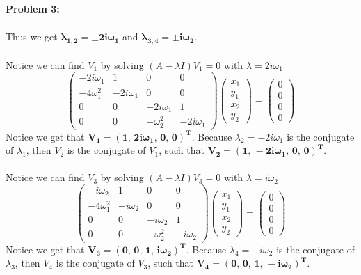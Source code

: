 \documentclass[11pt]{article}
\newenvironment{problem}[1]{\textbf{Problem #1: }}{\newpage}
\begin{document}
\begin{problem}{3}
\begin{enumerate}[label = (\alph*)]
\begin{align*}
			\end{align*}
			Thus we get $\boldsymbol{\lambda_{1,2} = \pm 2i\omega_1}$ and $\boldsymbol{\lambda_{3,4} = \pm i\omega_2}$.  
			\\ \\
			Notice we can find $V_1$ by solving $(A - \lambda I)V_1 = 0$ with $\lambda = 2i\omega_1$
			\[\begin{pmatrix}
				-2i\omega_1 & 1 & 0 & 0 \\
				-4\omega_1^2 & -2i\omega_1 & 0 & 0 \\
				0 & 0 & -2i\omega_1 & 1 \\
				0 & 0 & -\omega_2^2 & -2i\omega_1
			\end{pmatrix}\begin{pmatrix}
				x_1 \\ y_1 \\ x_2 \\ y_2	
			\end{pmatrix} = \begin{pmatrix}
				0 \\ 0 \\ 0 \\ 0
			\end{pmatrix}\]
			Notice we get that $\boldsymbol{V_1 = (1,\,2i\omega_1,\,0,\,0)^T}$.  Because $\lambda_2 = -2i\omega_1$ is the conjugate of $\lambda_1$, then $V_2$ is the conjugate of $V_1$, such that $\boldsymbol{V_2 = (1,\,-2i\omega_1,\,0,\,0)^T}$.
			\\ \\
			Notice we can find $V_3$ by solving $(A - \lambda I)V_3 = 0$ with $\lambda = i\omega_2$
			\[\begin{pmatrix}
				-i\omega_2 & 1 & 0 & 0 \\
				-4\omega_1^2 & -i\omega_2 & 0 & 0 \\
				0 & 0 & -i\omega_2 & 1 \\
				0 & 0 & -\omega_2^2 & -i\omega_2
			\end{pmatrix}\begin{pmatrix}
				x_1 \\ y_1 \\ x_2 \\ y_2	
			\end{pmatrix} = \begin{pmatrix}
				0 \\ 0 \\ 0 \\ 0
			\end{pmatrix}\]
			Notice we get that $\boldsymbol{V_3 = (0,\,0,\,1,\,i\omega_2)^T}$.  Because $\lambda_4 = -i\omega_2$ is the conjugate of $\lambda_3$, then $V_4$ is the conjugate of $V_3$, such that $\boldsymbol{V_4 = (0,\,0,\,1,\,-i\omega_2)^T}$.

\end{enumerate}
\end{problem}
\end{document}
